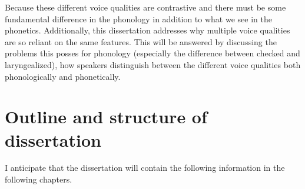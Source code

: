 \documentclass[12pt, letterpaper]{article}
\begin{document}
Because these different voice qualities are contrastive and there must be some fundamental difference in the phonology in addition to what we see in the phonetics. Additionally, this dissertation addresses why multiple voice qualities are so reliant on the same features. This will be answered by discussing the problems this posses for phonology (especially the difference between checked and laryngealized), how speakers distinguish between the different voice qualities both phonologically and phonetically. 


\section{Outline and structure of dissertation} \label{sec:Outline}

I anticipate that the dissertation will contain the following information in the following chapters.
\end{document}
